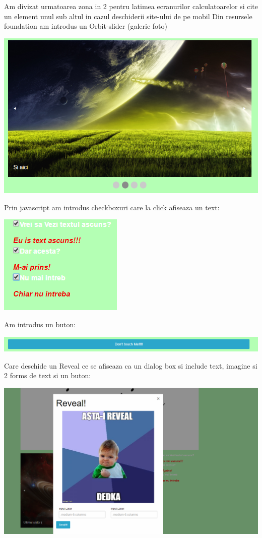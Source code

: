 Am divizat urmatoarea zona in 2 pentru latimea ecranurilor calculatoarelor si cite un element unul sub altul in cazul deschiderii site-ului de pe mobil
Din resursele foundation am introdus un Orbit-slider (galerie foto)
\begin{center}
\includegraphics[width=0.7\linewidth]{5}
\end{center}
Prin javascript am introdus checkboxuri care la click afiseaza un text:
\begin{center}
\includegraphics[width=0.5\linewidth]{6}
\end{center}
Am introdus un buton:
\begin{center}
\includegraphics[width=0.7\linewidth]{7}
\end{center}
Care deschide un Reveal ce se afiseaza ca un dialog box si include text, imagine si 2 forms de text si un buton:
\begin{center}
\includegraphics[width=0.7\linewidth]{8}
\end{center}

